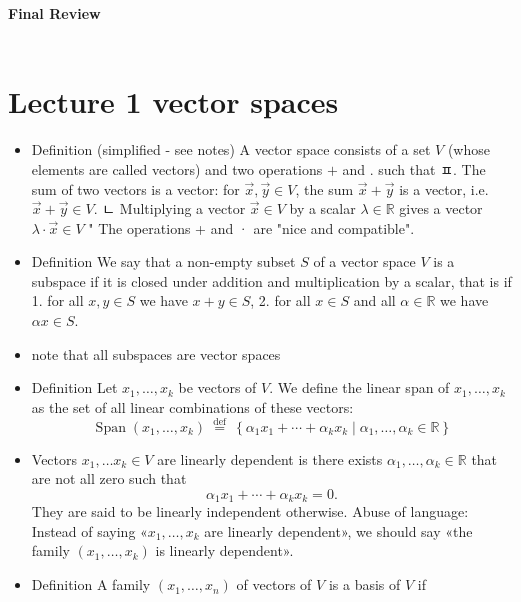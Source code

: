 \documentclass[12pt,twoside]{article}
\begin{document}
\begin{center}
{\large{\textbf{Final Review}} } \vspace{0.2cm}\\

\\
\end{center}
\section{ Lecture 1 vector spaces}
\begin{itemize}
    \item {}Definition (simplified - see notes)
A vector space consists of a set $V$ (whose elements are called vectors) and two operations $+$ and . such that
ㅍ. The sum of two vectors is a vector: for $\vec{x}, \vec{y} \in V$, the sum $\vec{x}+\vec{y}$ is a vector, i.e. $\vec{x}+\vec{y} \in V$.
ㄴ Multiplying a vector $\vec{x} \in V$ by a scalar $\lambda \in \mathbb{R}$ gives a vector $\lambda \cdot \vec{x} \in V$
" The operations + and · are "nice and compatible".
\item {}Definition
We say that a non-empty subset $S$ of a vector space $V$ is a subspace if it is closed under addition and multiplication by a scalar, that is if
1. for all $x, y \in S$ we have $x+y \in S$,
2. for all $x \in S$ and all $\alpha \in \mathbb{R}$ we have $\alpha x \in S$.  
\item note that all subspaces are vector spaces
\item {}Definition
Let $x_1, \ldots, x_k$ be vectors of $V$. We define the linear span of $x_1, \ldots, x_k$ as the set of all linear combinations of these vectors:
$$
\operatorname{Span}\left(x_1, \ldots, x_k\right) \stackrel{\text { def }}{=}\left\{\alpha_1 x_1+\cdots+\alpha_k x_k \mid \alpha_1, \ldots, \alpha_k \in \mathbb{R}\right\}
$$
\item {}Vectors $x_1, \ldots x_k \in V$ are linearly dependent is there exists $\alpha_1, \ldots, \alpha_k \in \mathbb{R}$ that are not all zero such that
$$
\alpha_1 x_1+\cdots+\alpha_k x_k=0 .
$$
They are said to be linearly independent otherwise. Abuse of language: Instead of saying $« x_1, \ldots, x_k$ are linearly dependent», we should say «the family $\left(x_1, \ldots, x_k\right)$ is linearly dependent».
\item {} Definition
A family $\left(x_1, \ldots, x_n\right)$ of vectors of $V$ is a basis of $V$ if\\

\end{itemize}
\end{document}
